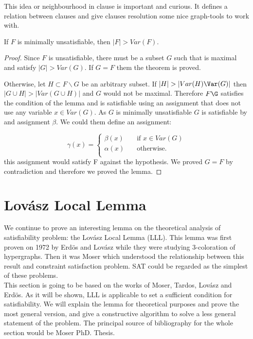 This idea or neighbourhood in clause is important and curious. It defines a relation between clauses and give clauses resolution some nice graph-tools to work with.

\begin{proposition}
	If $F$ is minimally unsatisfiable, then $|F| > Var(F)$.
\end{proposition}

\begin{proof}
  Since $F$ is unsatisfiable, there must be a subset $G$ such that is maximal and satisfy $|G| > Var(G)$. If $G=F$ them the theorem is proved.


  Otherwise, let $H \subset F\backslash G$ be an arbitrary subset. If $|H| > |Var(H)\Var(G)|$ then $|G \cup H| > |Var(G\cup H)|$ and $G$ would not be maximal.  Therefore $F\G$ satisfies the condition of the lemma and is satisfiable using an assignment that does not use any variable $x \in Var(G)$. As $G$ is minimally unsatisfiable $G$ is satisfiable by and assignment $\beta$. We could them define an assignment:

  \[   
\gamma(x) = 
     \begin{cases}
       \beta(x) &\quad\text{if } x \in Var(G)\\
       \alpha(x) &\quad\text{otherwise.} \\ 
     \end{cases}
   \]
this assignment would satisfy F against the hypothesis. We proved $G=F$ by contradiction and therefore we proved the lemma.
\end{proof}




\section{Lovász Local Lemma}
We continue to prove an interesting lemma on the theoretical analysis of satisfiability problem: the Lovász Local Lemma (LLL). This lemma was first proven on 1972 by Erdös and Lovász while they were studying 3-coloration of hypergraphs. Then it was Moser which understood the relationship between  this result and constraint satisfaction problem. SAT could be regarded as the simplest of these problems. \\


 
This section is going to be based on the works of Moser, Tardos, Lovász and Erdös. As it will be shown, LLL is applicable to set a sufficient condition for satisfiability.  We will explain the lemma for theoretical purposes and prove the most general version, and give a constructive algorithm to solve a less general statement of the problem. The principal source of bibliography for the whole section would be Moser PhD. Thesis\cite{moser2009constructive}. \\ 



